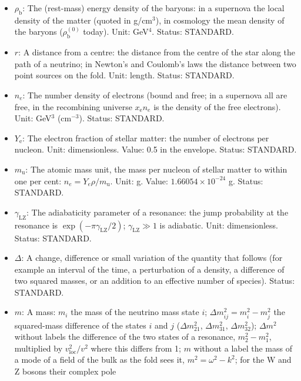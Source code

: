 \documentclass[
  10pt,
]{article}
\providecommand{\tightlist}{%
  \setlength{\itemsep}{0pt}\setlength{\parskip}{0pt}}
\begin{document}
\begin{itemize}
\tightlist
\item
  \(\rho_{\mathrm{b}}\): The (rest-mass) energy density of the baryons:
  in a supernova the local density of the matter (quoted in g/cm\(^3\)),
  in cosmology the mean density of the baryons
  (\(\rho_{\mathrm{b}}^{(0)}\) today). Unit: GeV\(^4\). Status:
  STANDARD.
\item
  \(r\): A distance from a centre: the distance from the centre of the
  star along the path of a neutrino; in Newton's and Coulomb's laws the
  distance between two point sources on the fold. Unit: length. Status:
  STANDARD.
\item
  \(n_e\): The number density of electrons (bound and free; in a
  supernova all are free, in the recombining universe
  \(x_{\mathrm{e}}n_e\) is the density of the free electrons). Unit:
  GeV\(^3\) (cm\(^{-3}\)). Status: STANDARD.
\item
  \(Y_{\mathrm{e}}\): The electron fraction of stellar matter: the
  number of electrons per nucleon. Unit: dimensionless. Value: 0.5 in
  the envelope. Status: STANDARD.
\item
  \(m_{\mathrm{u}}\): The atomic mass unit, the mass per nucleon of
  stellar matter to within one per cent:
  \(n_e = Y_e\rho/m_{\mathrm{u}}\). Unit: g. Value:
  \(1.66054\times10^{-24}\) g. Status: STANDARD.
\item
  \(\gamma_{\mathrm{LZ}}\): The adiabaticity parameter of a resonance:
  the jump probability at the resonance is
  \(\exp(-\pi\gamma_{\mathrm{LZ}}/2)\); \(\gamma_{\mathrm{LZ}} \gg 1\)
  is adiabatic. Unit: dimensionless. Status: STANDARD.
\item
  \(\Delta\): A change, difference or small variation of the quantity
  that follows (for example an interval of the time, a perturbation of a
  density, a difference of two squared masses, or an addition to an
  effective number of species). Status: STANDARD.
\item
  \(m\): A mass: \(m_i\) the mass of the neutrino mass state \(i\);
  \(\Delta m_{ij}^2 = m_i^2 - m_j^2\) the squared-mass difference of the
  states \(i\) and \(j\) (\(\Delta m_{21}^2\), \(\Delta m_{31}^2\),
  \(\Delta m_{32}^2\)); \(\Delta m^2\) without labels the difference of
  the two states of a resonance, \(m_2^2 - m_1^2\), multiplied by
  \(v_{\mathrm{loc}}^2/v^2\) where this differs from 1; \(m\) without a
  label the mass of a mode of a field of the bulk as the fold sees it,
  \(m^2 = \omega^2 - k^2\); for the W and Z bosons their complex pole

\end{itemize}
\end{document}
